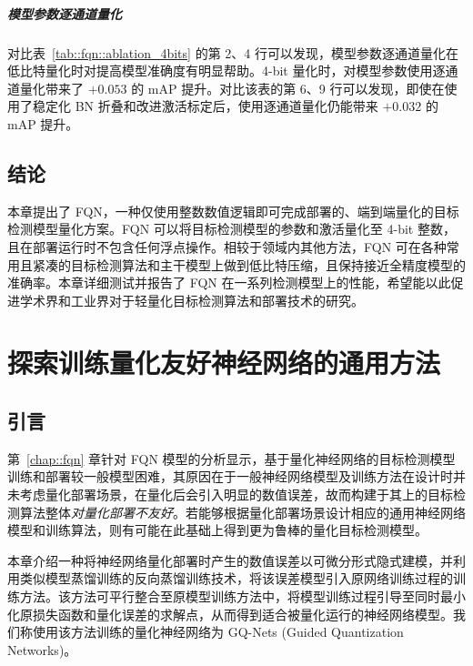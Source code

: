 \documentclass[
]{shtthesis}
\begin{document}
\paragraph{模型参数逐通道量化}
对比表~\ref{tab::fqn::ablation_4bits} 的第 2、4 行可以发现，模型参数逐通道量化在低比特量化时对提高模型准确度有明显帮助。4-bit 量化时，对模型参数使用逐通道量化带来了 $+0.053$ 的 mAP 提升。对比该表的第 6、9 行可以发现，即使在使用了稳定化 BN 折叠和改进激活标定后，使用逐通道量化仍能带来 $+0.032$ 的 mAP 提升。
\section{结论}
本章提出了 FQN，一种仅使用整数数值逻辑即可完成部署的、端到端量化的目标检测模型量化方案。FQN 可以将目标检测模型的参数和激活量化至 4-bit 整数，且在部署运行时不包含任何浮点操作。相较于领域内其他方法，FQN 可在各种常用且紧凑的目标检测算法和主干模型上做到低比特压缩，且保持接近全精度模型的准确率。本章详细测试并报告了 FQN 在一系列检测模型上的性能，希望能以此促进学术界和工业界对于轻量化目标检测算法和部署技术的研究。
\chapter{探索训练量化友好神经网络的通用方法} \label{chap::gq_nets}
\section{引言}
第~\ref{chap::fqn} 章针对 FQN 模型的分析显示，基于量化神经网络的目标检测模型训练和部署较一般模型困难，其原因在于一般神经网络模型及训练方法在设计时并未考虑量化部署场景，在量化后会引入明显的数值误差，故而构建于其上的目标检测算法整体\emph{对量化部署不友好}。若能够根据量化部署场景设计相应的通用神经网络模型和训练算法，则有可能在此基础上得到更为鲁棒的量化目标检测模型。

本章介绍一种将神经网络量化部署时产生的数值误差以可微分形式隐式建模，并利用类似模型蒸馏训练的反向蒸馏训练技术，将该误差模型引入原网络训练过程的训练方法。该方法可平行整合至原模型训练方法中，将模型训练过程引导至同时最小化原损失函数和量化误差的求解点，从而得到适合被量化运行的神经网络模型。我们称使用该方法训练的量化神经网络为 GQ-Nets (Guided Quantization Networks)。
\end{document}
